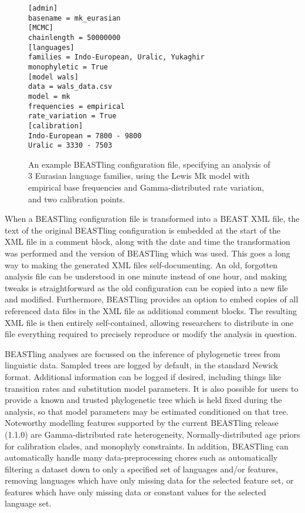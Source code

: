 \documentclass[twocolumn,10pt]{scrartcl}
\begin{document}
\begin{figure}[t]
	\begin{verbatim}[admin]
basename = mk_eurasian
[MCMC]
chainlength = 50000000
[languages]
families = Indo-European, Uralic, Yukaghir
monophyletic = True
[model wals]
data = wals_data.csv
model = mk
frequencies = empirical
rate_variation = True
[calibration]
Indo-European = 7800 - 9800
Uralic = 3330 - 7503\end{verbatim}
	\caption{An example BEASTling configuration file, specifying an analysis of 3 Eurasian language families, using the Lewis Mk model with empirical base frequencies and Gamma-distributed rate variation, and two calibration points.}
\label{fig:config}
\end{figure}

When a BEASTling configuration file is transformed into a BEAST XML file, the text of the original BEASTling configuration is embedded at the start of the XML file in a comment block, along with the date and time the transformation was performed and the version of BEASTling which was used.  This goes a long way to making the generated XML files self-documenting.  An old, forgotten analysis file can be understood in one minute instead of one hour, and making tweaks is straightforward as the old configuration can be copied into a new file and modified.  Furthermore, BEASTling provides an option to embed copies of all referenced data files in the XML file as additional comment blocks.  The resulting XML file is then entirely self-contained, allowing researchers to distribute in one file everything required to precisely reproduce or modify the analysis in question.

BEASTling analyses are focussed on the inference of phylogenetic trees from linguistic data.  Sampled trees are logged by default, in the standard Newick format.  Additional information can be logged if desired, including things like transition rates and substitution model parameters.  It is also possible for users to provide a known and trusted phylogenetic tree which is held fixed during the analysis, so that model parameters may be estimated conditioned on that tree.  Noteworthy modelling features supported by the current BEASTling release (1.1.0) are Gamma-distributed rate heterogeneity, Normally-distributed age priors for calibration clades, and monophyly constraints.  In addition, BEASTling can automatically handle many data-preprocessing chores such as automatically filtering a dataset down to only a specified set of languages and/or features, removing languages which have only missing data for the selected feature set, or features which have only missing data or constant values for the selected language set.
\end{document}
